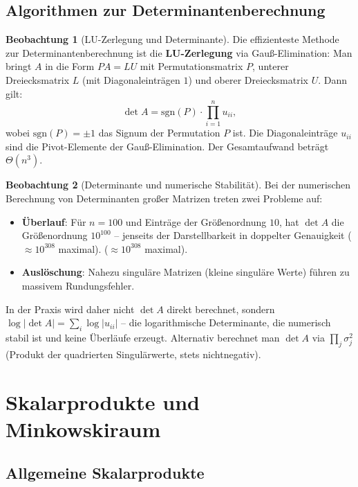 ﻿\documentclass[a4paper,12pt]{report}
\theoremstyle{definition}
\newtheorem{beobachtung}{Beobachtung}
\begin{document}
\section{Algorithmen zur Determinantenberechnung}

\begin{beobachtung}[LU-Zerlegung und Determinante]
    Die effizienteste Methode zur Determinantenberechnung ist die
    \textbf{LU-Zerlegung} via Gauß-Elimination: Man bringt $A$
    in die Form $PA = LU$ mit Permutationsmatrix $P$, unterer
    Dreiecksmatrix $L$ (mit Diagonaleinträgen $1$) und oberer
    Dreiecksmatrix $U$. Dann gilt:
    \[
        \det A = \mathrm{sgn}(P) \cdot \prod_{i=1}^n u_{ii},
    \]
    wobei $\mathrm{sgn}(P) = \pm 1$ das Signum der Permutation $P$ ist.
    Die Diagonaleinträge $u_{ii}$ sind die Pivot-Elemente der
    Gauß-Elimination. Der Gesamtaufwand beträgt $\Theta(n^3)$.
\end{beobachtung}

\begin{beobachtung}[Determinante und numerische Stabilität]
    Bei der numerischen Berechnung von Determinanten großer Matrizen
    treten zwei Probleme auf:
    \begin{itemize}
        \item[-] \textbf{Über\-lauf}: Für $n = 100$ und Einträge der
              Größen\-ordnung $10$, hat $\det A$ die Größen\-ordnung $10^{100}$
              -- jenseits der Darstellbarkeit
              in doppelter Genauigkeit ($\approx 10^{308}$ maximal).
              ($\approx 10^{308}$ maximal).
        \item[-] \textbf{Auslöschung}: Nahezu singuläre Matrizen
              (kleine singuläre Werte) führen zu massivem Rundungsfehler.
    \end{itemize}
    In der Praxis wird daher nicht $\det A$ direkt berechnet, sondern
    $\log|\det A| = \sum_i \log|u_{ii}|$ -- die logarithmische
    Determinante, die numerisch stabil ist und keine Überläufe erzeugt.
    Alternativ berechnet man $\det A$ via $\prod_j \sigma_j^2$
    (Produkt der quadrierten Singulärwerte, stets nichtnegativ).
\end{beobachtung}

\chapter{Skalarprodukte und Minkowskiraum}

\section{Allgemeine Skalarprodukte}
\end{document}
